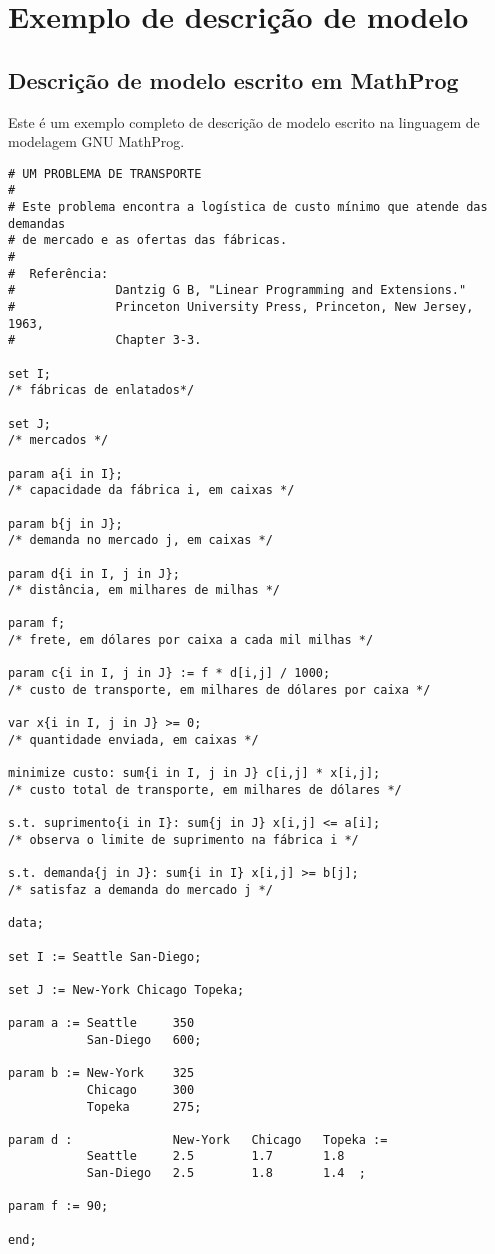 \documentclass[11pt, brazil]{report}
\begin{document}

\chapter{Exemplo de descrição de modelo}

\section{Descrição de modelo escrito em MathProg}

Este é um exemplo completo de descrição de modelo escrito na linguagem
de modelagem GNU MathProg.

\bigskip

\begin{verbatim}
# UM PROBLEMA DE TRANSPORTE
#
# Este problema encontra a logística de custo mínimo que atende das demandas
# de mercado e as ofertas das fábricas.
#
#  Referência:
#              Dantzig G B, "Linear Programming and Extensions."
#              Princeton University Press, Princeton, New Jersey, 1963,
#              Chapter 3-3.

set I;
/* fábricas de enlatados*/

set J;
/* mercados */

param a{i in I};
/* capacidade da fábrica i, em caixas */

param b{j in J};
/* demanda no mercado j, em caixas */

param d{i in I, j in J};
/* distância, em milhares de milhas */

param f;
/* frete, em dólares por caixa a cada mil milhas */

param c{i in I, j in J} := f * d[i,j] / 1000;
/* custo de transporte, em milhares de dólares por caixa */

var x{i in I, j in J} >= 0;
/* quantidade enviada, em caixas */

minimize custo: sum{i in I, j in J} c[i,j] * x[i,j];
/* custo total de transporte, em milhares de dólares */

s.t. suprimento{i in I}: sum{j in J} x[i,j] <= a[i];
/* observa o limite de suprimento na fábrica i */

s.t. demanda{j in J}: sum{i in I} x[i,j] >= b[j];
/* satisfaz a demanda do mercado j */

data;

set I := Seattle San-Diego;

set J := New-York Chicago Topeka;

param a := Seattle     350
           San-Diego   600;

param b := New-York    325
           Chicago     300
           Topeka      275;

param d :              New-York   Chicago   Topeka :=
           Seattle     2.5        1.7       1.8
           San-Diego   2.5        1.8       1.4  ;

param f := 90;

end;
\end{verbatim}
\end{document}
